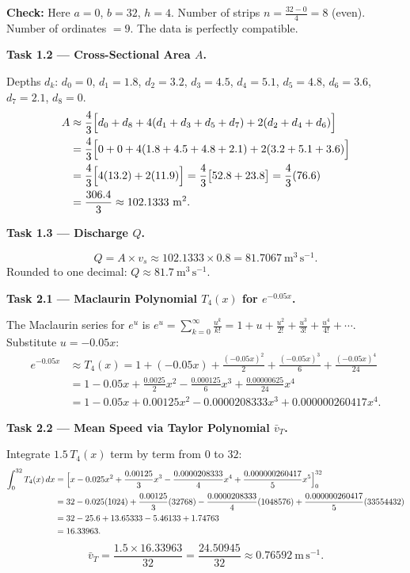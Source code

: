 \documentclass[11pt]{article}
\begin{document}
\textbf{Check:} Here $a=0$, $b=32$, $h=4$. Number of strips $n = \frac{32-0}{4} = 8$ (even). Number of ordinates $= 9$. The data is perfectly compatible.

\textbf{Task 1.2 — Cross-Sectional Area $A$.}\par
Depths $d_k$: $d_0=0$, $d_1=1.8$, $d_2=3.2$, $d_3=4.5$, $d_4=5.1$, $d_5=4.8$, $d_6=3.6$, $d_7=2.1$, $d_8=0$.
\begin{align*}
A &\approx \frac{4}{3}\Bigl[ d_0 + d_8 + 4(d_1+d_3+d_5+d_7) + 2(d_2+d_4+d_6) \Bigr] \\
  &= \frac{4}{3}\Bigl[ 0 + 0 + 4(1.8 + 4.5 + 4.8 + 2.1) + 2(3.2 + 5.1 + 3.6) \Bigr] \\
  &= \frac{4}{3}\Bigl[ 4(13.2) + 2(11.9) \Bigr] = \frac{4}{3}\bigl[ 52.8 + 23.8 \bigr] = \frac{4}{3}(76.6) \\
  &= \frac{306.4}{3} \approx 102.1333\ \mathrm{m^{2}}.
\end{align*}

\textbf{Task 1.3 — Discharge $Q$.}\par
\[ Q = A \times v_s \approx 102.1333 \times 0.8 = 81.7067\ \mathrm{m^{3}\,s^{-1}}. \]
Rounded to one decimal: $Q \approx 81.7\ \mathrm{m^{3}\,s^{-1}}$.

\vspace{0.5em}
\textbf{Task 2.1 — Maclaurin Polynomial $T_4(x)$ for $e^{-0.05x}$.}\par
The Maclaurin series for $e^u$ is $e^u = \sum_{k=0}^{\infty} \frac{u^k}{k!} = 1 + u + \frac{u^2}{2!} + \frac{u^3}{3!} + \frac{u^4}{4!} + \cdots$.
Substitute $u = -0.05x$:
\begin{align*}
e^{-0.05x} &\approx T_4(x) = 1 + (-0.05x) + \frac{(-0.05x)^2}{2} + \frac{(-0.05x)^3}{6} + \frac{(-0.05x)^4}{24} \\
&= 1 - 0.05x + \frac{0.0025}{2}x^2 - \frac{0.000125}{6}x^3 + \frac{0.00000625}{24}x^4 \\
&= 1 - 0.05x + 0.00125x^2 - 0.0000208333x^3 + 0.000000260417x^4.
\end{align*}

\textbf{Task 2.2 — Mean Speed via Taylor Polynomial $\bar v_T$.}\par
Integrate $1.5\,T_4(x)$ term by term from $0$ to $32$:
\begin{align*}
\int_{0}^{32} T_4(x)\,dx &= \Bigl[ x - 0.025x^2 + \frac{0.00125}{3}x^3 - \frac{0.0000208333}{4}x^4 + \frac{0.000000260417}{5}x^5 \Bigr]_{0}^{32} \\
&= 32 - 0.025(1024) + \frac{0.00125}{3}(32768) - \frac{0.0000208333}{4}(1048576) + \frac{0.000000260417}{5}(33554432) \\
&= 32 - 25.6 + 13.65333 - 5.46133 + 1.74763 \\
&= 16.33963.
\end{align*}
\[ \bar v_T = \frac{1.5 \times 16.33963}{32} = \frac{24.50945}{32} \approx 0.76592\ \mathrm{m\,s^{-1}}. \]
\end{document}
